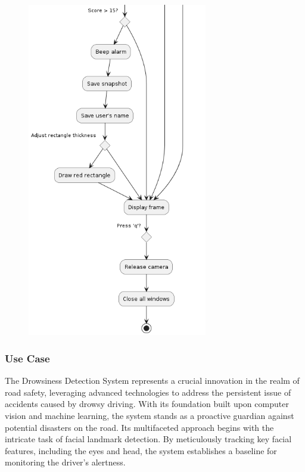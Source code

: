 \documentclass[12pt]{article}
\begin{document}
\begin{figure}[h]
\centering
\includegraphics[width=0.7\textwidth]{act2}
\end{figure}
\FloatBarrier


\subsubsection{Use Case}
The Drowsiness Detection System represents a crucial innovation in the realm of road safety, leveraging advanced technologies to address the persistent issue of accidents caused by drowsy driving. With its foundation built upon computer vision and machine learning, the system stands as a proactive guardian against potential disasters on the road. Its multifaceted approach begins with the intricate task of facial landmark detection. By meticulously tracking key facial features, including the eyes and head, the system establishes a baseline for monitoring the driver's alertness.
\end{document}
